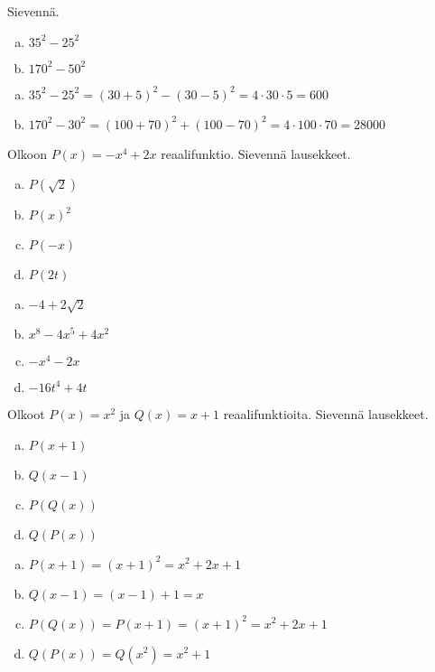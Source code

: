 \begin{tehtava}
    Sievennä.
    \begin{enumerate}[a)]
        \item $35^2-25^2$
        \item $170^2-50^2$
    \end{enumerate}
    \begin{vastaus}
        \begin{enumerate}[a)]
            \item $35^2-25^2 = (30+5)^2-(30-5)^2 = 4\cdot 30\cdot 5 = 600$
            \item $170^2-30^2 = (100+70)^2+(100-70)^2 = 4\cdot 100\cdot 70 = 28000$
        \end{enumerate}
    \end{vastaus}
\end{tehtava}

\begin{tehtava}
    Olkoon $P(x)=-x^4+2x$ reaalifunktio. Sievennä lausekkeet.
    \begin{enumerate}[a)]
		\item $P(\sqrt{2})$
        \item $P(x)^2$
        \item $P(-x)$
        \item $P(2t)$
    \end{enumerate}
    \begin{vastaus}
        \begin{enumerate}[a)]
            \item $-4 + 2\sqrt{2}$
            \item $x^8 - 4x^5 + 4x^2$
            \item $-x^4-2x$
            \item $-16t^4+4t$
        \end{enumerate}
    \end{vastaus}
\end{tehtava}

\begin{tehtava}
    Olkoot $P(x)=x^2$ ja $Q(x)=x+1$ reaalifunktioita. Sievennä lausekkeet.
    \begin{enumerate}[a)]
        \item $P(x+1)$
        \item $Q(x-1)$
        \item $P(Q(x))$
        \item $Q(P(x))$
    \end{enumerate}
    \begin{vastaus}
        \begin{enumerate}[a)]
            \item $P(x+1) = (x+1)^2 = x^2+2x+1$
            \item $Q(x-1) = (x-1)+1 = x$
            \item $P(Q(x)) = P(x+1) = (x+1)^2 = x^2+2x+1$
            \item $Q(P(x)) = Q(x^2) = x^2+1$
        \end{enumerate}
    \end{vastaus}
\end{tehtava}


